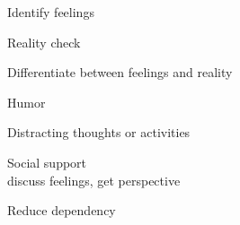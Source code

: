 \documentclass[aspectratio=169]{beamer}
\begin{document}
\begin{frame}
  \begin{center}
    \Huge Identify feelings
    \\ \small \cite{caltech}
  \end{center}
\end{frame}

\begin{frame}
  \begin{center}
    \Huge Reality check
    \\ \small \cite{caltech}
  \end{center}
\end{frame}

\begin{frame}
  \begin{center}
    \Huge Differentiate between feelings and reality
    \\ \small \cite{caltech}
  \end{center}
\end{frame}

\begin{frame}
  \begin{center}
    \Huge Humor
    \\ \small \cite{hh15}
  \end{center}
\end{frame}

\begin{frame}
  \begin{center}
    \Huge Distracting thoughts or activities
    \\ \small \cite{hh15}
  \end{center}
\end{frame}

\begin{frame}
  \begin{center}
    \Huge Social support
    \\ \small \cite{caltech}
     discuss feelings, get perspective
  \end{center}
\end{frame}

\begin{frame}
  \begin{center}
    \Huge Reduce dependency
    \\ \small \cite{langford93}
  \end{center}
\end{frame}
\end{document}
